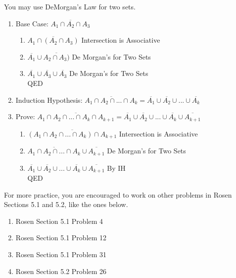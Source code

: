 \begin{enumerate}
        You may use DeMorgan's Law for two sets.
        \begin{enumerate}
            \item Base Case: $\overline{A_1 \cap A_2 \cap A_3}$
            \begin{enumerate}
                \item $\overline{A_1 \cap (A_2 \cap A_3)}$ Intersection is Associative
                \item $\overline{A_1} \cup \overline{A_2 \cap A_3)}$ De Morgan's for Two Sets
                \item $\overline{A_1} \cup \overline{A_3} \cup \overline{A_3}$ De Morgan's for Two Sets \\ \null\hfill QED
            \end{enumerate}
            \item Induction Hypothesis: $\overline{A_1 \cap A_2 \cap ... \cap A_k} = \overline{A_1} \cup \overline{A_2} \cup ... \cup \overline{A_k}$
            \item Prove: $\overline{A_1 \cap A_2 \cap ... \cap A_k \cap A_{k + 1}} = \overline{A_1} \cup \overline{A_2} \cup ... \cup \overline{A_k} \cup \overline{A_{k + 1}}$
            \begin{enumerate}
                \item $\overline{(A_1 \cap A_2 \cap ... \cap A_k) \cap A_{k + 1}}$ Intersection is Associative
                \item $\overline{A_1 \cap A_2 \cap ... \cap A_k} \cup \overline{A_{k + 1}}$ De Morgan's for Two Sets
                \item $\overline{A_1} \cup \overline{A_2} \cup ... \cup \overline{A_k} \cup \overline{A_{k + 1}}$ By IH \\ \null\hfill QED
            \end{enumerate}
        \end{enumerate}

    \end{enumerate}

    For more practice, you are encouraged to work on other problems in Rosen Sections 5.1 and 5.2, like the ones below.

    \begin{enumerate}

        \item Rosen Section 5.1 Problem 4

        \item Rosen Section 5.1 Problem 12

        \item Rosen Section 5.1 Problem 31

        \item Rosen Section 5.2 Problem 26

    \end{enumerate}




        



